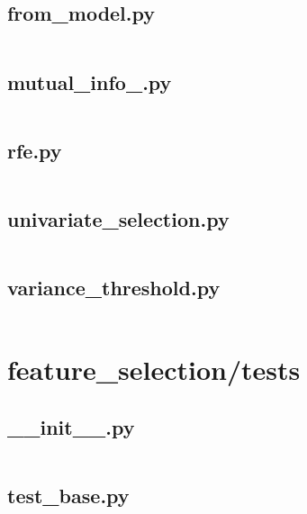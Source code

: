\documentclass{article}
\begin{document}
\subsection{from\_model.py}
\inputminted{python}{/home/dufferzafar/dev/@clones/scikit-learn/sklearn/feature_selection/from_model.py}
\newpage

\subsection{mutual\_info\_.py}
\inputminted{python}{/home/dufferzafar/dev/@clones/scikit-learn/sklearn/feature_selection/mutual_info_.py}
\newpage

\subsection{rfe.py}
\inputminted{python}{/home/dufferzafar/dev/@clones/scikit-learn/sklearn/feature_selection/rfe.py}
\newpage

\subsection{univariate\_selection.py}
\inputminted{python}{/home/dufferzafar/dev/@clones/scikit-learn/sklearn/feature_selection/univariate_selection.py}
\newpage

\subsection{variance\_threshold.py}
\inputminted{python}{/home/dufferzafar/dev/@clones/scikit-learn/sklearn/feature_selection/variance_threshold.py}
\newpage

\section{feature\_selection/tests}

\subsection{\_\_init\_\_.py}
\inputminted{python}{/home/dufferzafar/dev/@clones/scikit-learn/sklearn/feature_selection/tests/__init__.py}
\newpage

\subsection{test\_base.py}
\inputminted{python}{/home/dufferzafar/dev/@clones/scikit-learn/sklearn/feature_selection/tests/test_base.py}
\newpage
\end{document}
